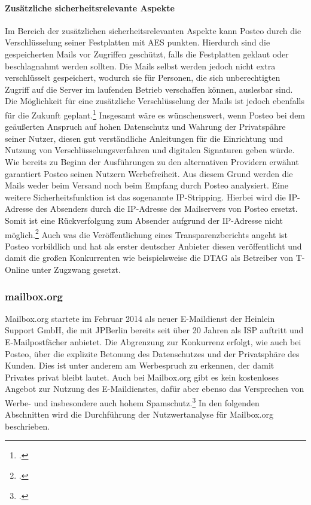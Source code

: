 \documentclass  [paper=a4,
				fontsize=12pt,
				listof=totoc,
				bibliography=totoc
				]{scrreprt}
\begin{document}
					\paragraph{Zusätzliche sicherheitsrelevante Aspekte}
						Im Bereich der zusätzlichen sicherheitsrelevanten Aspekte kann Posteo durch die Verschlüsselung seiner Festplatten mit \ac{AES} punkten.
						Hierdurch sind die gespeicherten Mails vor Zugriffen geschützt, falls die Festplatten geklaut oder beschlagnahmt werden sollten.
						Die Mails selbst werden jedoch nicht extra verschlüsselt gespeichert, wodurch sie für Personen, die sich unberechtigten Zugriff auf die Server im laufenden Betrieb verschaffen können, auslesbar sind.
						Die Möglichkeit für eine zusätzliche Verschlüsselung der Mails ist jedoch ebenfalls für die Zukunft geplant.\footcite[Vgl.][]{Posteo2013c}
						Insgesamt wäre es wünschenswert, wenn Posteo bei dem geäußerten Anspruch auf hohen Datenschutz und Wahrung der Privatspähre seiner Nutzer, diesen gut verständliche Anleitungen für die Einrichtung und Nutzung von Verschlüsselungsverfahren und digitalen Signaturen geben würde.
						Wie bereits zu Beginn der Ausführungen zu den alternativen Providern erwähnt garantiert Posteo seinen Nutzern Werbefreiheit.
						Aus diesem Grund werden die Mails weder beim Versand noch beim Empfang durch Posteo analysiert.
						Eine weitere Sicherheitsfunktion ist das sogenannte \ac{IP}-Stripping.
						Hierbei wird die \ac{IP}-Adresse des Absenders durch die \ac{IP}-Adresse des Mailservers von Posteo ersetzt.
						Somit ist eine Rückverfolgung zum Absender aufgrund der \ac{IP}-Adresse nicht möglich.\footcite[Vgl.][]{Posteo2013a}
						Auch was die Veröffentlichung eines Transparenzberichts angeht ist Posteo vorbildlich und hat als erster deutscher Anbieter diesen veröffentlicht und damit die großen Konkurrenten wie beispielsweise die \ac{DTAG} als Betreiber von T-Online unter Zugzwang gesetzt.
					
					
				\subsubsection{mailbox.org}
				\label{subsubsec:mailbox}
					Mailbox.org startete im Februar 2014 als neuer E-Maildienst der Heinlein Support GmbH, die mit JPBerlin bereits seit über 20 Jahren als \ac{ISP} auftritt und E-Mailpostfächer anbietet.
					Die Abgrenzung zur Konkurrenz erfolgt, wie auch bei Posteo, über die explizite Betonung des Datenschutzes und der Privatsphäre des Kunden.
					Dies ist unter anderem am Werbespruch zu erkennen, der \glqq damit Privates privat bleibt\grqq{} lautet.
					Auch bei Mailbox.org gibt es kein kostenloses Angebot zur Nutzung des E-Maildienstes, dafür aber ebenso das Versprechen von Werbe- und insbesondere auch hohem Spamschutz.\footcite[Vgl.][]{Mailbox2014}
					In den folgenden Abschnitten wird die Durchführung der Nutzwertanalyse für Mailbox.org beschrieben.
					
\end{document}
